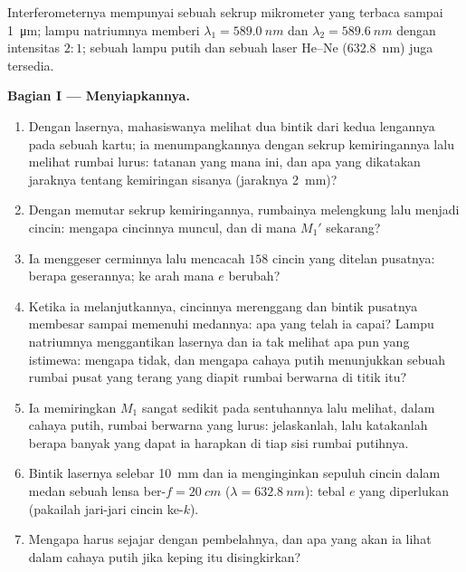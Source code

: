 \begin{problem}
\label{pb:b2:michelson:1}

Interferometernya mempunyai sebuah sekrup mikrometer yang terbaca sampai \qty{1}{\micro m};
lampu natriumnya memberi $\lambda_1 = \qty{589.0}{nm}$ dan $\lambda_2 = \qty{589.6}{nm}$ dengan
intensitas $2 : 1$; sebuah lampu putih dan sebuah laser He--Ne (\qty{632.8}{nm}) juga
tersedia.

\medskip
\noindent\textbf{Bagian I --- Menyiapkannya.}
\begin{enumerate}
  \item Dengan lasernya, mahasiswanya melihat dua bintik dari kedua lengannya pada
        sebuah kartu; ia menumpangkannya dengan sekrup kemiringannya lalu melihat
        rumbai lurus: tatanan yang mana ini, dan apa yang dikatakan
        jaraknya tentang kemiringan sisanya (jaraknya \qty{2}{mm})?
  \item Dengan memutar sekrup kemiringannya, rumbainya melengkung lalu menjadi
        cincin: mengapa cincinnya muncul, dan di mana $M_1'$ sekarang?
  \item Ia menggeser cerminnya lalu mencacah $158$ cincin yang ditelan
        pusatnya: berapa geserannya; ke arah mana $e$ berubah?
  \item Ketika ia melanjutkannya, cincinnya merenggang dan bintik pusatnya membesar
        sampai memenuhi medannya: apa yang telah ia capai? Lampu natriumnya
        menggantikan lasernya dan ia tak melihat apa pun yang istimewa: mengapa tidak, dan
        mengapa cahaya putih menunjukkan sebuah rumbai pusat yang terang yang diapit
        rumbai berwarna di titik itu?
  \item Ia memiringkan $M_1$ sangat sedikit pada sentuhannya lalu melihat, dalam cahaya
        putih, rumbai berwarna yang lurus: jelaskanlah, lalu katakanlah berapa banyak
        yang dapat ia harapkan di tiap sisi rumbai putihnya.
  \item Bintik lasernya selebar \qty{10}{mm} dan ia menginginkan sepuluh cincin
        dalam medan sebuah lensa ber-$f = \qty{20}{cm}$ ($\lambda = \qty{632.8}{nm}$):
        tebal $e$ yang diperlukan (pakailah jari-jari cincin ke-$k$).
  \item Mengapa  harus sejajar dengan pembelahnya,
        dan apa yang akan ia lihat dalam cahaya putih jika keping itu disingkirkan?
\end{enumerate}


\end{problem}
